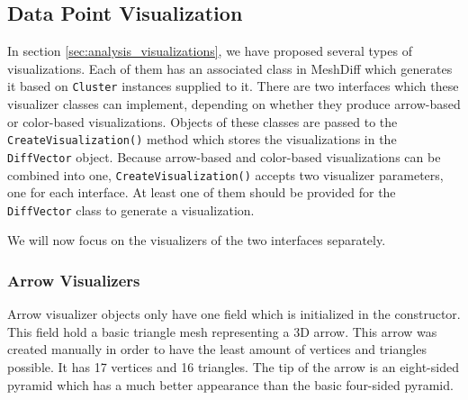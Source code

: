 \subsection{Data Point Visualization}

In section \ref{sec:analysis_visualizations}, we have proposed several types of visualizations. Each of them has an associated class in MeshDiff which generates it based on \verb+Cluster+ instances supplied to it. There are two interfaces which these visualizer classes can implement, depending on whether they produce arrow-based or color-based visualizations. Objects of these classes are passed to the \verb+CreateVisualization()+ method which stores the visualizations in the \verb+DiffVector+ object. Because arrow-based and color-based visualizations can be combined into one, \verb+CreateVisualization()+ accepts two visualizer parameters, one for each interface. At least one of them should be provided for the \verb+DiffVector+ class to generate a visualization.

We will now focus on the visualizers of the two interfaces separately.

\subsubsection{Arrow Visualizers}

Arrow visualizer objects only have one field which is initialized in the constructor. This field hold a basic triangle mesh representing a 3D arrow. This arrow was created manually in order to have the least amount of vertices and triangles possible. It has 17 vertices and 16 triangles. The tip of the arrow is an eight-sided pyramid which has a much better appearance than the basic four-sided pyramid.

